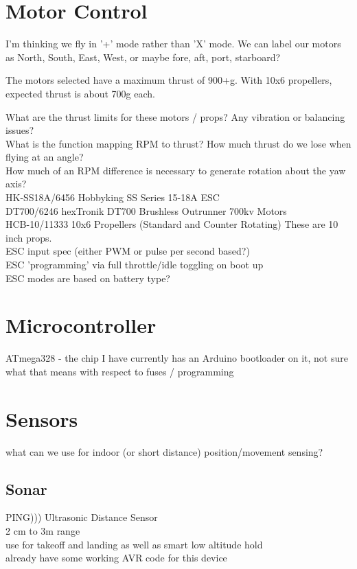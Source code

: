 \documentclass{article}
\begin{document}
\section{Motor Control}
I'm thinking we fly in '+' mode rather than 'X' mode.  We can label our motors as North, South, East, West, or maybe fore, aft, port, starboard?

The motors selected have a maximum thrust of 900+g.  With 10x6 propellers, expected thrust is about 700g each.

What are the thrust limits for these motors / props? Any vibration or balancing issues?\\
What is the function mapping RPM to thrust?  How much thrust do we lose when flying at an angle?\\
How much of an RPM difference is necessary to generate rotation about the yaw axis?\\

HK-SS18A/6456 Hobbyking SS Series 15-18A ESC\\
DT700/6246 hexTronik DT700 Brushless Outrunner 700kv Motors\\
HCB-10/11333 10x6 Propellers (Standard and Counter Rotating) These are 10 inch props.\\

ESC input spec (either PWM or pulse per second based?)\\
ESC 'programming' via full throttle/idle toggling on boot up\\
ESC modes are based on battery type?\\

\section{Microcontroller}
ATmega328 - the chip I have currently has an Arduino bootloader on it, not sure what that means with respect to fuses / programming

\section{Sensors}
what can we use for indoor (or short distance) position/movement sensing?

\subsection{Sonar}
PING))) Ultrasonic Distance Sensor\\
2 cm to 3m range\\
use for takeoff and landing as well as smart low altitude hold\\
already have some working AVR code for this device
\end{document}
